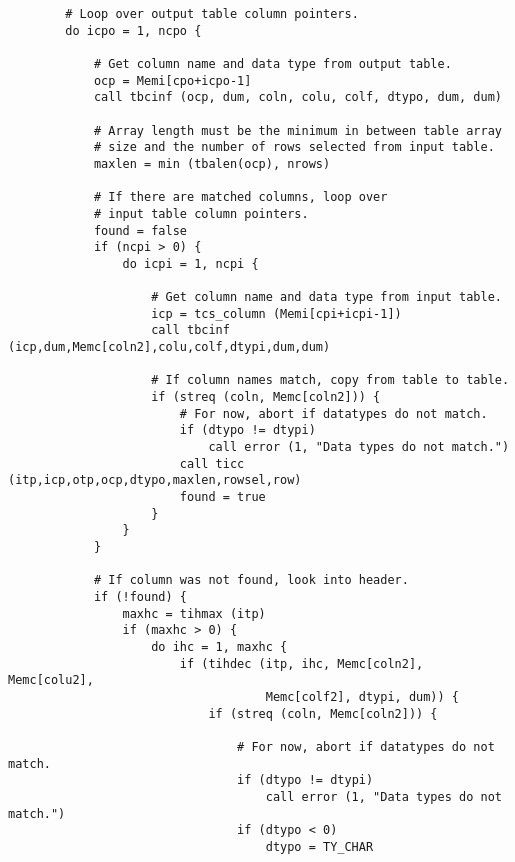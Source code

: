 \begin{verbatim}
        # Loop over output table column pointers.
        do icpo = 1, ncpo {

            # Get column name and data type from output table.
            ocp = Memi[cpo+icpo-1]
            call tbcinf (ocp, dum, coln, colu, colf, dtypo, dum, dum)

            # Array length must be the minimum in between table array 
            # size and the number of rows selected from input table. 
            maxlen = min (tbalen(ocp), nrows)

            # If there are matched columns, loop over 
            # input table column pointers.
            found = false
            if (ncpi > 0) {
                do icpi = 1, ncpi {

                    # Get column name and data type from input table.
                    icp = tcs_column (Memi[cpi+icpi-1])
                    call tbcinf (icp,dum,Memc[coln2],colu,colf,dtypi,dum,dum)

                    # If column names match, copy from table to table.
                    if (streq (coln, Memc[coln2])) {
                        # For now, abort if datatypes do not match.
                        if (dtypo != dtypi)
                            call error (1, "Data types do not match.")
                        call ticc (itp,icp,otp,ocp,dtypo,maxlen,rowsel,row)
                        found = true
                    }
                }
            }

            # If column was not found, look into header.
            if (!found) {
                maxhc = tihmax (itp)
                if (maxhc > 0) {
                    do ihc = 1, maxhc {
                        if (tihdec (itp, ihc, Memc[coln2], Memc[colu2], 
                                    Memc[colf2], dtypi, dum)) {
                            if (streq (coln, Memc[coln2])) {

                                # For now, abort if datatypes do not match.
                                if (dtypo != dtypi)
                                    call error (1, "Data types do not match.")
                                if (dtypo < 0)
                                    dtypo = TY_CHAR


\end{verbatim}
